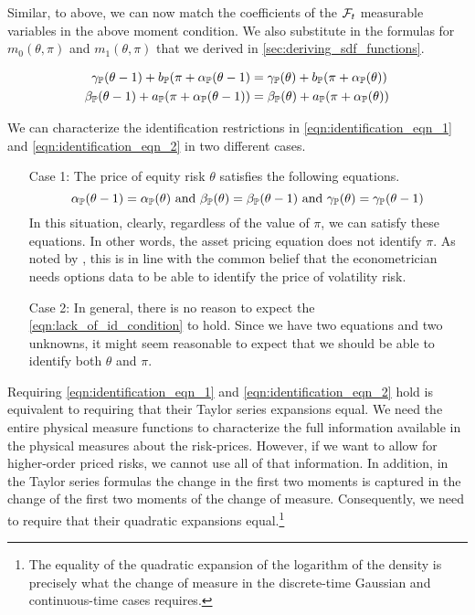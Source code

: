 \documentclass[11pt, letterpaper, twoside, final]{article}
\begin{document}
Similar, to above, we can now match the coefficients of the $\mathcal{F}_t$ measurable variables in the above moment
condition. 
We also substitute in the formulas for $m_0(\theta, \pi)$ and $m_1(\theta, \pi)$ that we derived in
\cref{sec:deriving_sdf_functions}.

\begin{align}
    \label{eqn:identification_eqn_1}
   \gamma_{\mathbb{P}}(\theta-1) + b_{\mathbb{P}}(\pi + \alpha_{\mathbb{P}}(\theta - 1)  &= \gamma_{\mathbb{P}}(\theta) +
       b_{\mathbb{P}}(\pi + \alpha_{\mathbb{P}}(\theta))  \\
    \label{eqn:identification_eqn_2}
    \beta_{\mathbb{P}}(\theta-1) + a_{\mathbb{P}}(\pi + \alpha_{\mathbb{P}}(\theta -1)) &= \beta_{\mathbb{P}}(\theta) +
        a_{\mathbb{P}}(\pi + \alpha_{\mathbb{P}}(\theta)) 
\end{align}

We can characterize the identification restrictions in \cref{eqn:identification_eqn_1} and
\cref{eqn:identification_eqn_2} in two different cases.   

\begin{enumerate}
    \item[Case 1:] The price of equity risk $\theta$ satisfies the following equations. 
        \begin{equation}
            \alpha_{\PP}(\theta - 1) = \alpha_{\PP}(\theta)\ \text{and}\ \beta_{\PP}(\theta) = \beta_{\PP}(\theta
            -1)\ \text{and}\ \gamma_{\PP}(\theta) = \gamma_{\PP}(\theta - 1)
            \label{eqn:lack_of_id_condition}
        \end{equation}
        In this situation, clearly, regardless of the value of $\pi$, we can satisfy these equations.
        In other words, the asset pricing equation does not identify $\pi$. 
        As noted by \textcite{khrapov2016affine}, this is in line with the common belief that the econometrician
        needs options data to be able to identify the price of volatility risk. 
    \item[Case 2:] 
        In general, there is no reason to expect the \cref{eqn:lack_of_id_condition} to hold.
        Since we have two equations and two unknowns, it might seem reasonable to expect that we should be able to
        identify both $\theta$ and $\pi$.
\end{enumerate}

Requiring \cref{eqn:identification_eqn_1} and \cref{eqn:identification_eqn_2} hold is equivalent to
requiring that their Taylor series expansions equal.
We need the entire physical measure functions to characterize the full information available in the physical
measures about the risk-prices.
However, if we want to allow for higher-order priced risks, we cannot use all of that information.
In addition, in the Taylor series formulas the change in the first two moments is captured in the change of the
first two moments of the change of measure.
Consequently, we need to require that their quadratic expansions equal.\footnote{The equality of the quadratic
    expansion of the logarithm of the density is precisely what the change of measure in the discrete-time
Gaussian and continuous-time cases requires.}
\end{document}
